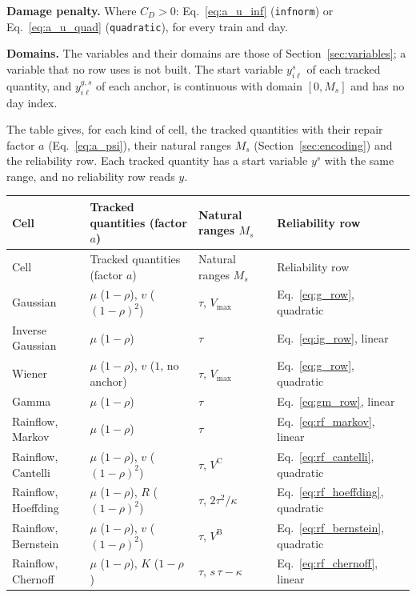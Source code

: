 \documentclass[11pt,a4paper]{article}
\theoremstyle{plain}
\theoremstyle{definition}
\renewcommand{\_}{\textunderscore\allowbreak{}}
\begin{document}
\textbf{Damage penalty.} Where $C_D > 0$: Eq.~\eqref{eq:a_u_inf}
(\texttt{inf\_norm}) or Eq.~\eqref{eq:a_u_quad} (\texttt{quadratic}), for every train
and day.

\textbf{Domains.} The variables and their domains are those of
Section~\ref{sec:variables}; a variable that no row uses is not built. The start
variable $y^s_{i\ell}$ of each tracked quantity, and $y^{g,s}_{i\ell}$ of each anchor,
is continuous with domain $[0, M_s]$ and has no day index.

The table gives, for each kind of cell, the tracked quantities with their repair
factor $a$ (Eq.~\eqref{eq:a_psi}), their natural ranges $M_s$
(Section~\ref{sec:encoding}) and the reliability row. Each tracked quantity has a
start variable $y^s$ with the same range, and no reliability row reads $y$.

\begingroup\small
\begin{longtable}{@{}L{3.1cm}L{4.4cm}L{3.0cm}L{4.0cm}@{}}
\toprule
Cell & Tracked quantities (factor $a$) & Natural ranges $M_s$ & Reliability row \\
\midrule
\endfirsthead
\toprule
Cell & Tracked quantities (factor $a$) & Natural ranges $M_s$ & Reliability row \\
\midrule
\endhead
Gaussian & $\mu$ ($1-\rho$), $v$ ($(1-\rho)^2$) & $\tau$, $V_{\max}$ &
  Eq.~\eqref{eq:g_row}, quadratic \\
Inverse Gaussian & $\mu$ ($1-\rho$) & $\tau$ & Eq.~\eqref{eq:ig_row}, linear \\
Wiener & $\mu$ ($1-\rho$), $v$ ($1$, no anchor) & $\tau$, $V_{\max}$ &
  Eq.~\eqref{eq:g_row}, quadratic \\
Gamma & $\mu$ ($1-\rho$) & $\tau$ & Eq.~\eqref{eq:gm_row}, linear \\
Rainflow, Markov & $\mu$ ($1-\rho$) & $\tau$ & Eq.~\eqref{eq:rf_markov}, linear \\
Rainflow, Cantelli & $\mu$ ($1-\rho$), $v$ ($(1-\rho)^2$) & $\tau$, $V^{\mathrm{C}}$ &
  Eq.~\eqref{eq:rf_cantelli}, quadratic \\
Rainflow, Hoeffding & $\mu$ ($1-\rho$), $R$ ($(1-\rho)^2$) & $\tau$, $2\tau^2/\kappa$ &
  Eq.~\eqref{eq:rf_hoeffding}, quadratic \\
Rainflow, Bernstein & $\mu$ ($1-\rho$), $v$ ($(1-\rho)^2$) & $\tau$, $V^{\mathrm{B}}$ &
  Eq.~\eqref{eq:rf_bernstein}, quadratic \\
Rainflow, Chernoff & $\mu$ ($1-\rho$), $K$ ($1-\rho$) & $\tau$, $s\,\tau - \kappa$ &
  Eq.~\eqref{eq:rf_chernoff}, linear \\
\bottomrule
\end{longtable}
\endgroup
\end{document}

